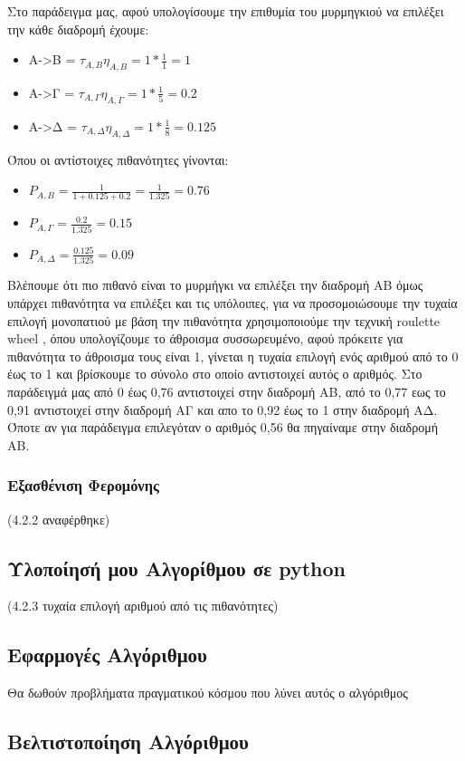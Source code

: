 Στο παράδειγμα μας, αφού υπολογίσουμε την επιθυμία του μυρμηγκιού να επιλέξει την κάθε διαδρομή έχουμε:

\begin{itemize}
    \item Α->Β = $τ_{Α,Β}η_{Α,Β}=1*\frac{1}{1}=1$ 
    \item Α->Γ = $τ_{Α,Γ}η_{Α,Γ}=1*\frac{1}{5}=0.2$
    \item Α->Δ = $τ_{Α,Δ}η_{Α,Δ}=1*\frac{1}{8}=0.125$
\end{itemize}

Όπου οι αντίστοιχες πιθανότητες γίνονται:

\begin{itemize}
    \item $P_{A,B}=\frac{1}{1+0.125+0.2}=\frac{1}{1.325}=0.76$
    \item $P_{Α,Γ}=\frac{0.2}{1.325}=0.15$
    \item $P_{A,Δ}=\frac{0.125}{1.325}=0.09$
\end{itemize}

Βλέπουμε ότι πιο πιθανό είναι το μυρμήγκι να επιλέξει την διαδρομή ΑΒ όμως υπάρχει πιθανότητα να επιλέξει και τις υπόλοιπες, για να προσομοιώσουμε την τυχαία επιλογή μονοπατιού με βάση την πιθανότητα χρησιμοποιούμε την τεχνική roulette wheel \cite{Adam-Dorota}, όπου υπολογίζουμε το άθροισμα συσσωρευμένο, αφού πρόκειτε για πιθανότητα το άθροισμα τους είναι 1, γίνεται η τυχαία επιλογή ενός αριθμού από το 0 έως το 1 και βρίσκουμε το σύνολο στο οποίο αντιστοιχεί αυτός ο αριθμός. Στο παράδειγμά μας από 0 έως 0,76 αντιστοιχεί στην διαδρομή ΑΒ, από το 0,77 εως το 0,91 αντιστοιχεί στην διαδρομή ΑΓ και απο το 0,92 έως το 1 στην διαδρομή ΑΔ. Όποτε αν για παράδειγμα επιλεγόταν ο αριθμός 0,56 θα πηγαίναμε στην διαδρομή ΑΒ.

\subsubsection{Εξασθένιση Φερομόνης}
(4.2.2 αναφέρθηκε)

\subsection{Υλοποίησή μου Αλγορίθμου σε python}
(4.2.3 τυχαία επιλογή αριθμού από τις πιθανότητες)

\subsection{Εφαρμογές Αλγόριθμου}
Θα δωθούν  προβλήματα πραγματικού κόσμου που λύνει αυτός ο αλγόριθμος

\subsection{Βελτιστοποίηση Αλγόριθμου}
